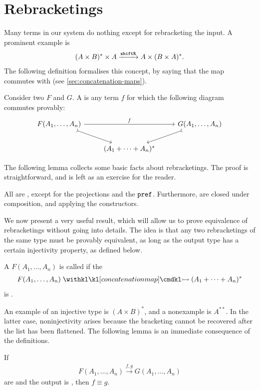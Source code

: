 \section{Rebracketings}
\label{sec:rebracketings}
Many terms in our system do nothing except for rebracketing the input. A prominent example is
\begin{align*}
(A \times B)^* \times A 
\xrightarrow{\mathtt{shiftR}}
A \times (B \times A)^*.
\end{align*}
The following definition formalises this concept, by saying that the map commutes with  (see \cref{sec:concatenation-maps}).
\begin{definition}
    [Rebracketing] Consider two  $F$ and $G$. A  is any term $f$ for which  the following diagram commutes provably:
\[
\begin{tikzcd}
F(A_1,\ldots,A_n) 
\ar[rr,"f"] 
\ar[dr,\concar]
& 
& 
G(A_1,\ldots,A_n)
\ar[dl,\concar]
\\
&
(A_1 + \cdots + A_n)^*
\end{tikzcd}
\]
\end{definition}
The following lemma collects some basic facts about rebracketings. The proof is straightforward, and is left as an exercise for the reader.
\begin{lemma}\label{lem:rebracketing-basic-facts}
    All  are , except for the projections and the  $\mathtt{pref}$. Furthermore,  are closed under composition, and applying the  constructors.
\end{lemma}
We now present a very useful result, which will allow us to prove equivalence of rebracketings without going into details. The idea is that any two rebracketings of the same type must be provably equivalent, as  long as the output type has a certain  injectivity property, as defined below.
\begin{definition}
    A  $F(A_1,\ldots,A_n)$ is called  if the 
        \begin{align*}
    F(A_1,\ldots,A_n) \concmap (A_1 + \cdots + A_n)^*
    \end{align*}
    is .
\end{definition}
An example of an injective type is $(A \times B)^*$, and a nonexample is $A^{**}$. In the latter case, noninjectivity arises because the bracketing cannot be recovered after the list has been flattened. The following lemma is an immediate consequence of the definitions. 
\begin{lemma}\label{lem:uniqueness-of-rebracketings}
If
    \begin{align*}
    F(A_1,\ldots,A_n) \xrightarrow{f,g} G(A_1,\ldots,A_n)
    \end{align*}
    are  and the output  is , then $f \equiv g$.
\end{lemma}


